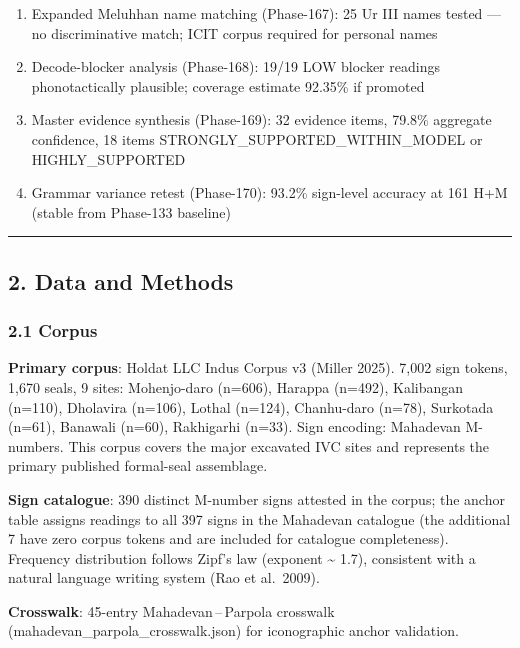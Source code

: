 \documentclass[
]{article}
\begin{document}
\begin{enumerate}
  Sibilant DEDR cross-validation (Phase-166): M330=can, M165=cul,
  M202=can (within-model supported); M198=co (provisional) --- all 4 DEDR-backed
\item
  Expanded Meluhhan name matching (Phase-167): 25 Ur III names tested ---
  no discriminative match; ICIT corpus required for personal names
\item
  Decode-blocker analysis (Phase-168): 19/19 LOW blocker readings
  phonotactically plausible; coverage estimate 92.35\% if promoted
\item
  Master evidence synthesis (Phase-169): 32 evidence items, 79.8\%
  aggregate confidence, 18 items STRONGLY\_SUPPORTED\_WITHIN\_MODEL or HIGHLY\_SUPPORTED
\item
  Grammar variance retest (Phase-170): 93.2\% sign-level accuracy at
  161 H+M (stable from Phase-133 baseline)
\end{enumerate}

\begin{center}\rule{0.5\linewidth}{0.5pt}\end{center}

\subsection{2. Data and Methods}\label{data-and-methods}

\subsubsection{2.1 Corpus}\label{corpus}

\textbf{Primary corpus}: Holdat LLC Indus Corpus v3 (Miller 2025). 7,002
sign tokens, 1,670 seals, 9 sites: Mohenjo-daro (n=606), Harappa
(n=492), Kalibangan (n=110), Dholavira (n=106), Lothal (n=124),
Chanhu-daro (n=78), Surkotada (n=61), Banawali (n=60), Rakhigarhi
(n=33). Sign encoding: Mahadevan M-numbers. This corpus covers the major
excavated IVC sites and represents the primary published formal-seal
assemblage.

\textbf{Sign catalogue}: 390 distinct M-number signs attested in the corpus; the anchor table assigns readings to all 397 signs in the Mahadevan catalogue (the additional 7 have zero corpus tokens and are included for catalogue completeness). Frequency
distribution follows Zipf's law (exponent \textasciitilde{} 1.7), consistent with a
natural language writing system (Rao et al.~2009).

\textbf{Crosswalk}: 45-entry Mahadevan\,--\,Parpola crosswalk
(mahadevan\_parpola\_crosswalk.json) for iconographic anchor validation.
\end{document}
